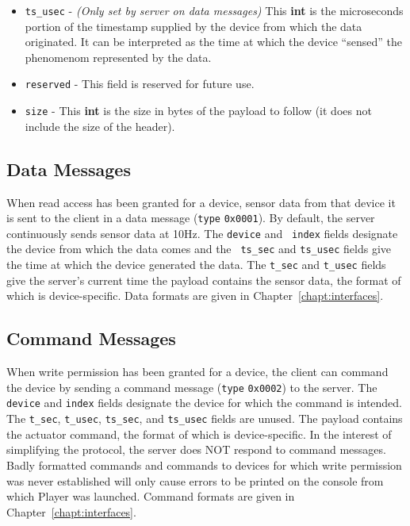\documentclass[11pt]{report}
\begin{document}
\begin{itemize}
\item {\tt ts\_usec} - {\em (Only set by server on data messages)} 
This {\bf int} is the microseconds portion of the timestamp supplied by the 
device from which the data originated.  It can be interpreted as the time 
at which the device ``sensed'' the phenomenom represented by the data.

\item {\tt reserved} - This field is reserved for future use.

\item {\tt size} - This {\bf int} is the size in bytes of the payload to
follow (it does not include the size of the header).

\end{itemize}

\subsection{Data Messages}
\label{sect:datamessages}
When read access has been granted for a device, sensor data from that device it
is sent to the client in a data message ({\tt type} {\tt 0x0001}). By default,
the server continuously sends sensor data at 10Hz.  The {\tt device} and {\tt
index} fields designate the device from which the data comes and the {\tt
ts\_sec} and {\tt ts\_usec} fields give the time at which the device generated
the data.  The {\tt t\_sec} and {\tt t\_usec} fields give the server's
current time the payload contains the sensor data, the format of which is
device-specific.  Data formats are given in Chapter~\ref{chapt:interfaces}.

\subsection{Command Messages}
\label{sect:commandmessages}
When write permission has been granted for a device, the client can command
the device by sending a command message ({\tt type} {\tt 0x0002}) to the
server.  The {\tt device} and {\tt index} fields designate the device
for which the command is intended.  The {\tt t\_sec}, {\tt t\_usec},
{\tt ts\_sec}, and {\tt ts\_usec} fields are unused.  The payload
contains the actuator command, the format of which is device-specific.
In the interest of simplifying the protocol, the server does NOT respond
to command messages.  Badly formatted commands and commands to devices for
which write permission was never established will only cause errors to be
printed on the console from which Player was launched.  Command formats are
given in Chapter~\ref{chapt:interfaces}.
\end{document}
